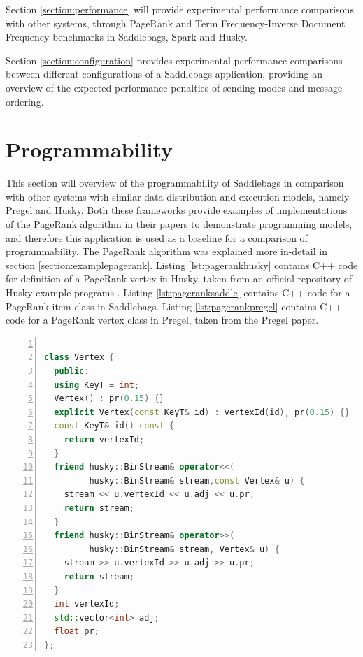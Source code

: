 \documentclass{uit-report}
\begin{document}
Section \ref{section:performance} will provide experimental performance comparisons with other systems, through PageRank and Term Frequency-Inverse Document Frequency benchmarks in Saddlebags, Spark and Husky.

Section \ref{section:configuration} provides experimental performance comparisons between different configurations of a Saddlebags application, providing an overview of the expected performance penalties of sending modes and message ordering.

\newpage
\section{Programmability}\label{section:programmability}
This section will overview of the programmability of Saddlebags in comparison with other systems with similar data distribution and execution models, namely Pregel and Husky. Both these frameworks provide examples of implementations of the PageRank algorithm in their papers \cite{husky} \cite{pregel} to demonstrate programming models, and therefore this application is used as a baseline for a comparison of programmability. The PageRank algorithm was explained more in-detail in section \ref{section:examplepagerank}. Listing \ref{lst:pagerankhusky} contains C++ code for definition of a PageRank vertex in Husky, taken from an official repository of Husky example programs \cite{huskyexample}. Listing \ref{lst:pageranksaddle} contains C++ code for a PageRank item class in Saddlebags. Listing \ref{lst:pagerankpregel} contains C++ code for a PageRank vertex class in Pregel, taken from the Pregel paper. 

\begin{lstlisting}[label={lst:pagerankhusky}, float=h!,frame=tlrb,numbers=left, caption={PageRank vertex class in Husky}, captionpos=t, language=c++, showstringspaces=false]

class Vertex {
  public:
  using KeyT = int;
  Vertex() : pr(0.15) {}
  explicit Vertex(const KeyT& id) : vertexId(id), pr(0.15) {}
  const KeyT& id() const {
    return vertexId;
  }
  friend husky::BinStream& operator<<(
         husky::BinStream& stream,const Vertex& u) {
    stream << u.vertexId << u.adj << u.pr;
    return stream;
  }
  friend husky::BinStream& operator>>(
         husky::BinStream& stream, Vertex& u) {
    stream >> u.vertexId >> u.adj >> u.pr;
    return stream;
  }
  int vertexId;
  std::vector<int> adj;
  float pr;
};
\end{lstlisting}
\end{document}
